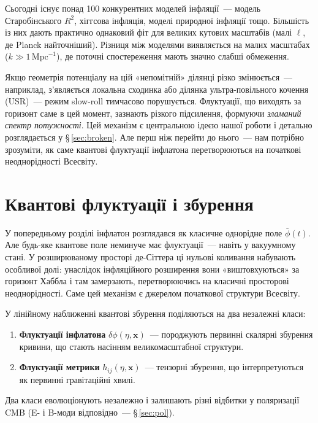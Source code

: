 \documentclass[12pt, a4paper]{article}
\begin{document}

Сьогодні існує понад 100 конкурентних моделей інфляції~---
модель Старобінського $R^2$, хіггсова інфляція, моделі природної
інфляції тощо. Більшість із них дають практично однаковий фіт для
великих кутових масштабів (малі $\ell$, де Planck найточніший).
Різниця між моделями виявляється на малих масштабах
($k \gg 1\,\mathrm{Mpc}^{-1}$), де поточні спостереження мають
значно слабші обмеження.

Якщо геометрія потенціалу на цій «непомітній» ділянці різко
змінюється~--- наприклад, з'являється локальна сходинка або ділянка
ультра-повільного кочення (USR)~--- режим slow-roll тимчасово
порушується. Флуктуації, що виходять за горизонт саме в цей момент,
зазнають різкого підсилення, формуючи \emph{зламаний спектр
потужності}. Цей механізм є центральною ідеєю нашої роботи і
детально розглядається у §\,\ref{sec:broken}. Але перш ніж перейти
до нього~--- нам потрібно зрозуміти, як саме квантові флуктуації
інфлатона перетворюються на початкові неоднорідності Всесвіту.


\section{Квантові флуктуації і збурення}
\label{sec:quantum}

У попередньому розділі інфлатон розглядався як класичне однорідне
поле $\bar{\phi}(t)$. Але будь-яке квантове поле неминуче має
флуктуації~--- навіть у вакуумному стані. У розширюваному просторі
де-Сіттера ці нульові коливання набувають особливої долі: унаслідок
інфляційного розширення вони «виштовхуються» за горизонт Хаббла і
там замерзають, перетворюючись на класичні просторові неоднорідності.
Саме цей механізм є джерелом початкової структури Всесвіту.

У лінійному наближенні квантові збурення поділяються на два
незалежні класи:
\begin{enumerate}
  \item \textbf{Флуктуації інфлатона} $\delta\phi(\eta, \mathbf{x})$~---
        породжують первинні скалярні збурення кривини, що стають
        насінням великомасштабної структури.
  \item \textbf{Флуктуації метрики} $h_{ij}(\eta, \mathbf{x})$~---
        тензорні збурення, що інтерпретуються як первинні
        гравітаційні хвилі.
\end{enumerate}
Два класи еволюціонують незалежно і залишають різні відбитки
у поляризації CMB (E- і B-моди відповідно~--- §\,\ref{sec:pol}).
\end{document}
